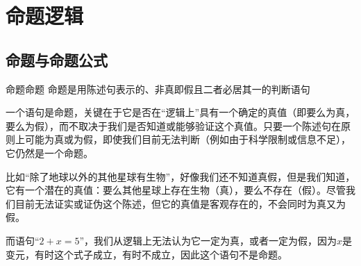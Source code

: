 \chapter{命题逻辑}
\section{命题与命题公式}
\begin{definition}{命题}{命题}
    命题是用陈述句表示的、非真即假且二者必居其一的判断语句
\end{definition}
一个语句是命题，关键在于它是否在“逻辑上”具有一个确定的真值（即要么为真，要么为假），而不取决于我们是否知道或能够验证这个真值。只要一个陈述句在原则上可能为真或为假，即使我们目前无法判断（例如由于科学限制或信息不足），它仍然是一个命题。

比如“除了地球以外的其他星球有生物”，好像我们还不知道真假，但是我们知道，它有一个潜在的真值：要么其他星球上存在生物（真），要么不存在（假）。尽管我们目前无法证实或证伪这个陈述，但它的真值是客观存在的，不会同时为真又为假。

而语句“$2+x=5$”，我们从逻辑上无法认为它一定为真，或者一定为假，因为$x$是变元，有时这个式子成立，有时不成立，因此这个语句不是命题。

